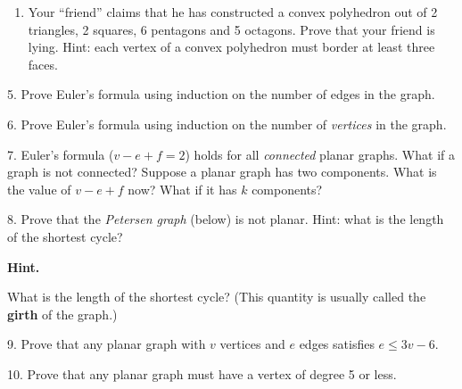 \documentclass[10pt,]{book}
\newcommand{\terminology}[1]{\textbf{#1}}
\theoremstyle{plain}
\theoremstyle{definition}
\numberwithin{equation}{chapter}
\newcommand{\vtx}[2]{node[fill,circle,inner sep=0pt, minimum size=4pt,label=#1:#2]{}}
\renewcommand{\v}{\vtx{above}{}}
\begin{document}
\begin{exerciselist}
\begin{enumerate}[label=(\alph*)]
\item\hypertarget{li-780}{}
          Your ``friend'' claims that he has constructed a convex polyhedron out of 2 triangles, 2 squares, 6 pentagons and 5 octagons. Prove that your friend is lying. Hint: each vertex of a convex polyhedron must border at least three faces.


\end{enumerate}

\par\smallskip
\item[5.]\hypertarget{exercise-286}{}
Prove Euler's formula using induction on the number of edges in the graph.
%
\par\smallskip
\item[6.]\hypertarget{exercise-287}{}
    Prove Euler's formula using induction on the number of \emph{vertices} in the graph.
\par\smallskip
\item[7.]\hypertarget{exercise-288}{}
Euler's formula (\(v - e + f = 2\)) holds for all \emph{connected} planar graphs. What if a graph is not connected? Suppose a planar graph has two components. What is the value of \(v - e + f\) now? What if it has \(k\) components?
%
\par\smallskip
\item[8.]\hypertarget{exercise-289}{}
        Prove that the \emph{Petersen graph} (below) is not planar. Hint: what is the length of the shortest cycle?
\leavevmode%
\begin{figure}
\centering
{
}
\end{figure}
\par\smallskip
\par\smallskip
\noindent\textbf{Hint.}\hypertarget{hint-15}{}\quad

        What is the length of the shortest cycle?  (This quantity is usually called the \terminology{girth} of the graph.)
\item[9.]\hypertarget{exercise-290}{}
Prove that any planar graph with \(v\) vertices and \(e\) edges satisfies \(e \le 3v - 6\).
%
\par\smallskip
\item[10.]\hypertarget{exercise-291}{}
Prove that any planar graph must have a vertex of degree 5 or less.
%
\par\smallskip
\end{exerciselist}
\typeout{************************************************}
\typeout{************************************************}
\end{document}
